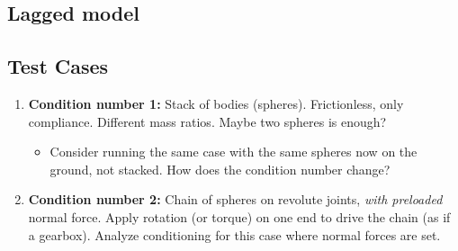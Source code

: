 \subsection{Lagged model}

\subsection{Test Cases}

\begin{enumerate}
    \item \textbf{Condition number 1:} Stack of bodies (spheres). Frictionless, only
    compliance. Different mass ratios. Maybe two spheres is enough? \begin{itemize}
        \item Consider running the same case with the same spheres now on the
        ground, not stacked. How does the condition number change?
    \end{itemize}
    \item \textbf{Condition number 2:} Chain of spheres on revolute joints, \textit{with
    preloaded} normal force. Apply rotation (or torque) on one end to drive the
    chain (as if a gearbox). Analyze conditioning for this case where normal
    forces are set.
\end{enumerate}


